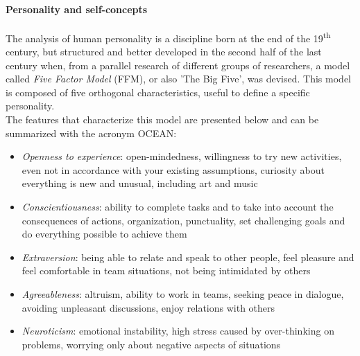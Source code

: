 \paragraph{Personality and self-concepts} 
The analysis of human personality is a discipline born at the end of the 19\textsuperscript{th} century, but structured and better developed in the second half of the last century when, from a parallel research of different groups of researchers, a model called \textit{Five Factor Model} (FFM), or also 'The Big Five', was devised.\textsuperscript{\cite{BigFive5}} This model is composed of five orthogonal characteristics, useful to define a specific personality. \\
The features that characterize this model are presented below and can be summarized with the acronym OCEAN\textsuperscript{\cite{FFMDescription}}:
\begin{itemize}
	\item \textit{Openness to experience}: open-mindedness, willingness to try new activities, even not in accordance with your existing assumptions, curiosity about everything is new and unusual, including art and music
	\item \textit{Conscientiousness}: ability to complete tasks and to take into account the consequences of actions, organization, punctuality, set challenging goals and do everything possible to achieve them
	\item \textit{Extraversion}: being able to relate and speak to other people, feel pleasure and feel comfortable in team situations, not being intimidated by others
	\item \textit{Agreeableness}: altruism, ability to work in teams, seeking peace in dialogue, avoiding unpleasant discussions, enjoy relations with others
	\item \textit{Neuroticism}: emotional instability, high stress caused by over-thinking on problems, worrying only about negative aspects of situations
\end{itemize}
